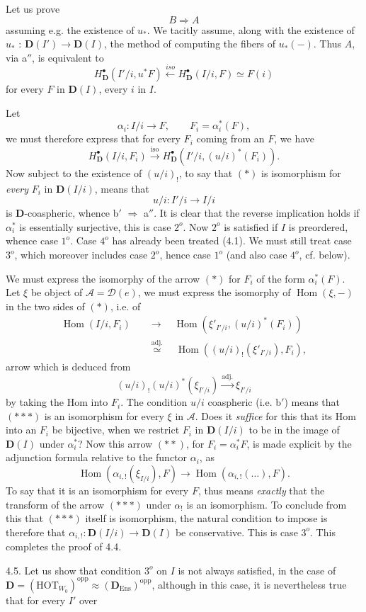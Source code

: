 \documentclass[11pt]{article}
\newcommand{\printedpage}[1]{\marginpar{\footnotesize p.~#1}}
\newcommand{\msp}[1]{\marginpar{\footnotesize [#1]}}
\newcommand{\Hom}{\operatorname{Hom}}
\newcommand{\bD}{\mathbf{D}}
\begin{document}
Let us prove
\[
B \Longrightarrow A
\]
assuming e.g. the existence of $u_*$. We tacitly assume, along with the existence of $u_*$ : $\bD(I') \longrightarrow \bD(I)$, the method of computing the fibers of $u_*(-)$. Thus $A$, via a$''$, is equivalent to
\[
H^{\bullet}_{\bD}(I'/i, u^*F) \xleftarrow{\mathit{iso}} H^{\bullet}_{\bD}(I/i, F) \simeq F(i)
\]
\printedpage{38}
for every $F$ in $\bD(I)$, every $i$ in $I$.

Let
\[
\alpha_i : I/i \longrightarrow F, \qquad F_i = \alpha_i^*(F), %
\]
we must therefore express that for every $F_i$ coming from an $F$, we have
\[
H^{\bullet}_{\bD}(I/i, F_i) \xrightarrow{\mathrm{iso}} H^{\bullet}_{\bD}(I'/i, (u/i)^*(F_i)). \tag*{$(\ast)$}
\]
Now subject to the existence of $(u/i)_!$, to say that $(\ast)$ is isomorphism for \textit{every} $F_i$ in $\bD(I/i)$, means that
\[
u/i : I'/i \longrightarrow I/i
\]
\msp{page 62}is $\bD$-coaspheric, whence b$'$ $\Longrightarrow$ a$''$. It is clear that the reverse implication holds if $\alpha_i^*$ is essentially surjective, this is case $2^o$. Now $2^o$ is satisfied if $I$ is preordered, whence case $1^o$. Case $4^o$ has already been treated (4.1). We must still treat case $3^o$, which moreover includes case $2^o$, hence case $1^o$ (and also case $4^o$, cf. below).

We must express the isomorphy of the arrow $(\ast)$ for $F_i$ of the form $\alpha_i^*(F)$. Let $\xi$ be object of $\mathcal{A} = \mathcal{D}(e)$, we must express the isomorphy of $\Hom(\xi, -)$ in the two sides of $(\ast)$, i.e. of
\[
\begin{aligned}
\Hom(I/i, F_i) \quad &\longrightarrow \quad \Hom(\xi'_{I'/i}, (u/i)^*(F_i)) \\
&\overset{\text{adj.}}{\simeq} \quad \Hom((u/i)_!(\xi'_{I'/i}), F_i),
\end{aligned}
\tag*{$(\ast\ast)$}
\]
 arrow which is deduced from
\[
(u/i)_!(u/i)^*(\xi_{I'/i}) \xrightarrow{\text{adj.}} \xi_{I'/i} \tag*{$(\ast\ast\ast)$}
\]
by taking the Hom into $F_i$. The condition $u/i$ coaspheric (i.e. b$'$) means that $(\ast\ast\ast)$ is an isomorphism for every $\xi$ in $\mathcal{A}$. Does it \textit{suffice} for this that its Hom into an $F_i$ be bijective, when we restrict $F_i$ in $\bD(I/i)$ to be in the image of $\bD(I)$ under $\alpha_i^*$? Now this arrow $(\ast\ast)$, for $F_i = \alpha_i^*F$, is made explicit by the adjunction formula relative \msp{page 63}to the functor $\alpha_i$, as
\[
\Hom(\alpha_{i,!}(\xi_{I/i}), F) \longrightarrow \Hom(\alpha_{i,!}(\ldots), F).
\]
To say that it is an isomorphism for every $F$, thus means \textit{exactly} that the transform of the arrow $(\ast\ast\ast)$ under $\alpha_!$ is an isomorphism. To conclude from this that $(\ast\ast\ast)$ itself is isomorphism, the natural condition to impose is therefore that $\alpha_{i,!} : \bD(I/i) \longrightarrow \bD(I)$ be conservative. This is case $3^o$. This completes the proof of 4.4.

4.5. Let us show that condition $3^o$ on $I$ is not always satisfied, in the case of $\bD = (\mathrm{HOT}_{W_0})^{\mathrm{opp}} \approx (\bD_{\mathrm{Ens}})^{\mathrm{opp}}$, although in this case, it is nevertheless true that for every $I'$ over
\end{document}
